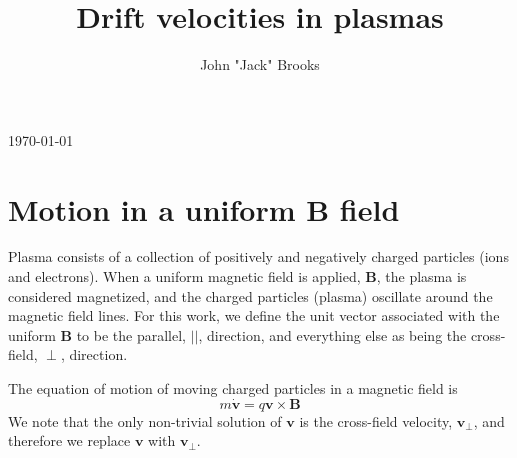\documentclass[12pt]{iopart}
\begin{document}
\title[Drift velocities in plasmas]{Drift velocities in plasmas}

\author{John "Jack" Brooks}

\vspace{10pt}
\begin{indented}
\item[]\today
\end{indented}


%
%
%
% 
%



\section{Motion in a uniform $\mathbf{B}$ field}

Plasma consists of a collection of positively and negatively charged particles (ions and electrons).  When a uniform magnetic field is applied, $\mathbf{B}$, the plasma is considered magnetized, and the charged particles (plasma) oscillate around the magnetic field lines.  For this work, we define the unit vector associated with the uniform $\mathbf{B}$ to be the parallel, $||$, direction, and everything else as being the cross-field, $\perp$, direction.

The equation of motion of moving charged particles in a magnetic field is
\begin{equation}
\label{eq:eom_simple}
m \dot{\mathbf{v}} = q \mathbf{v} \times \mathbf{B}
\end{equation}
We note that the only non-trivial solution of $\mathbf{v}$ is the cross-field velocity, $\mathbf{v}_\perp$, and therefore we replace $\mathbf{v}$ with $\mathbf{v}_\perp$.  
\end{document}
